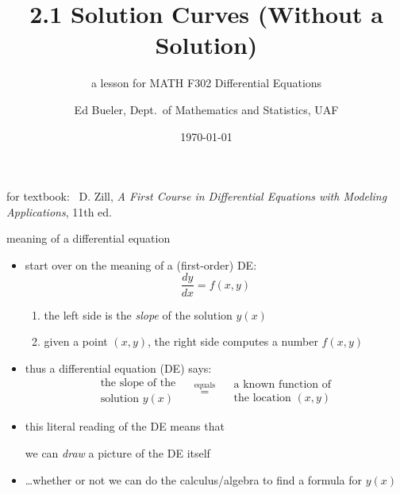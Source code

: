 \documentclass{beamer}
\title{2.1 Solution Curves (Without a Solution)}
\subtitle{a lesson for MATH F302 Differential Equations}
\author{Ed Bueler, Dept.~of Mathematics and Statistics, UAF}
\date{\tiny \today}
\begin{document}


\begin{frame}
\titlepage

\centerline{\tiny for textbook: \, D. Zill, \emph{A First Course in Differential Equations with Modeling Applications}, 11th ed.}
\end{frame}


\begin{frame}{meaning of a differential equation}

\begin{itemize}
\item start over on the meaning of a (first-order) DE:
    $$\frac{dy}{dx} = f(x,y)$$

\vspace{-2mm}
    \begin{enumerate}
    \item the left side is the \emph{slope} of the solution $y(x)$
    \item given a point $(x,y)$, the right side computes a number $f(x,y)$
    \end{enumerate}
\item thus a differential equation (DE) says:
    $$\begin{matrix}
    \text{the slope of the} \\
    \text{solution } y(x) 
    \end{matrix} \quad \stackrel{\text{equals}}{=} \quad
    \begin{matrix}
    \text{a known function of} \\
    \text{the location } (x,y)
    \end{matrix}$$
\item this literal reading of the DE means that

\centerline{\alert{we can \emph{draw} a picture of the DE itself}}

\item \dots whether or not we can do the calculus/algebra to find a formula for $y(x)$
\end{itemize}
\end{frame}
\end{document}
